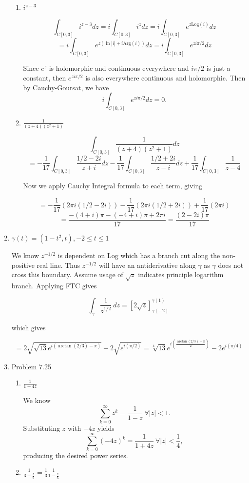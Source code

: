 \documentclass{article}
\newcommand{\Log}{\text{Log}}
\newcommand{\Arg}{\text{Arg}}
\begin{document}
\begin{enumerate}
\begin{enumerate}
		\item $i^{z-3}$
		
		\[\int_{C[0,3]}i^{z-3}dz=i\int_{C[0,3]}i^z dz = i\int_{C[0,3]}e^{z\Log(i)}dz \]
		\[= i\int_{C[0,3]}e^{z(\ln|i|+i\Arg(i))}dz=i\int_{C[0,3]}e^{zi\pi / 2}dz\]
		
		Since $e^{z}$ is holomorphic and continuous everywhere and $i\pi / 2$ is just a constant, then $e^{zi\pi / 2}$ is also everywhere continuous and holomorphic. Then by Cauchy-Goursat, we have
		\[i\int_{C[0,3]}e^{zi\pi / 2}dz=0. \]
		
		\item $\frac{1}{(z+4)(z^2+1)}$
		
		\[\int_{C[0,3]}\frac{1}{(z+4)(z^2+1)}dz \]
		\[ =-\frac{1}{17}\int_{C[0,3]}\frac{1/2-2i}{z+i}dz-\frac{1}{17}\int_{C[0,3]}\frac{1/2+2i}{z-i}dz+\frac{1}{17}\int_{C[0,3]}\frac{1}{z-4} \]
		
		Now we apply Cauchy Integral formula to each term, giving 
		
		\[=-\frac{1}{17}(2\pi i(1/2-2i))-\frac{1}{17}(2\pi i(1/2+2i))+\frac{1}{17}(2\pi i) \]
		\[=\frac{-(4+i)\pi - (-4+i)\pi + 2\pi i}{17}=\frac{(2-2i)\pi}{17} \]
	\end{enumerate}
	
	\item $\gamma(t)=(1-t^2, t), -2 \leq t \leq 1$
	
	We know $z^{-1/2}$ is dependent on $\Log$ which has a branch cut along the non-positive real line. Thus $z^{-1/2}$ will have an antiderivative along $\gamma$ as $\gamma$ does not cross this boundary. Assume usage of $\sqrt{z}$ indicates principle logarithm branch. Applying FTC gives 
	
	\[\int_{\gamma}\frac{1}{z^{1/2}}\ dz=[2\sqrt{z}]_{\gamma(-2)}^{\gamma(1)}  \]
	
	which gives
	
	\[=2\sqrt{\sqrt{13}e^{i(\arctan(2/3)-\pi)}}-2\sqrt{e^{i(\pi/2)}}= \sqrt[4]{13}e^{i(\frac{\arctan(2/3)-\pi}{2})} - 2e^{i(\pi/4)}\]
	\item Problem 7.25
	\begin{enumerate}
		\item $\frac{1}{1+4z}$
		
		We know
		\[\sum_{k=0}^{\infty}z^k = \frac{1}{1-z}\ \forall|z|<1. \]
		Substituting $z$ with $-4z$ yields
		\[\sum_{k=0}^{\infty}(-4z)^k = \frac{1}{1+4z}\ \forall |z|<\frac{1}{4} , \]
		producing the desired power series.
		
		\item $\frac{1}{3-\frac{z}{2}}=\frac{1}{3}\frac{1}{1-\frac{z}{6}}$
		

\end{enumerate}
\end{enumerate}
\end{document}
